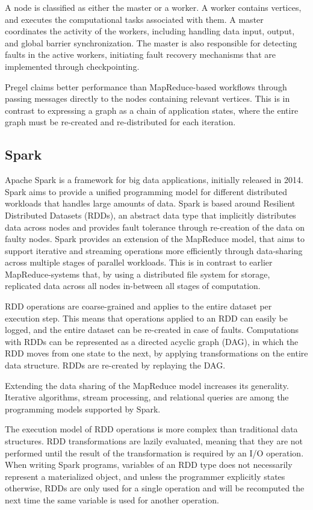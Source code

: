 \documentclass{uit-report}
\begin{document}
A node is classified as either the master or a worker. A worker contains vertices, and executes the computational tasks associated with them. A master coordinates the activity of the workers, including handling data input, output, and global barrier synchronization. The master is also responsible for detecting faults in the active workers, initiating fault recovery mechanisms that are implemented through checkpointing.

Pregel claims better performance than MapReduce-based workflows through passing messages directly to the nodes containing relevant vertices. This is in contrast to expressing a graph as a chain of application states, where the entire graph must be re-created and re-distributed for each iteration.

\subsection{Spark}
Apache Spark \cite{spark} is a framework for big data applications, initially released in 2014. Spark aims to provide a unified programming model for different distributed workloads that handles large amounts of data. Spark is based around Resilient Distributed Datasets (RDDs), an abstract data type that implicitly distributes data across nodes and provides fault tolerance through re-creation of the data on faulty nodes. Spark provides an extension of the MapReduce model, that aims to support iterative and streaming operations more efficiently through data-sharing across multiple stages of parallel workloads. This is in contrast to earlier MapReduce-systems that, by using a distributed file system for storage, replicated data across all nodes in-between all stages of computation.

RDD operations are coarse-grained and applies to the entire dataset per execution step. This means that operations applied to an RDD can easily be logged, and the entire dataset can be re-created in case of faults. Computations with RDDs can be represented as a directed acyclic graph (DAG), in which the RDD moves from one state to the next, by applying transformations on the entire data structure. RDDs are re-created by replaying the DAG.

Extending the data sharing of the MapReduce model increases its generality. Iterative algorithms, stream processing, and relational queries are among the programming models supported by Spark.

The execution model of RDD operations is more complex than traditional data structures. RDD transformations are lazily evaluated, meaning that they are not performed until the result of the transformation is required by an I/O operation. When writing Spark programs, variables of an RDD type does not necessarily represent a materialized object, and unless the programmer explicitly states otherwise, RDDs are only used for a single operation and will be recomputed the next time the same variable is used for another operation.
\end{document}
